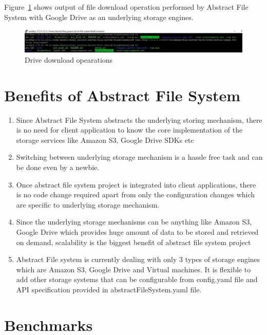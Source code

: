 Figure~\ref{fig:drive-download} 
shows output of file download operation performed 
by Abstract File System with Google Drive as an underlying storage engines. 

\begin{figure}[!ht]
        \centering\includegraphics[width=\columnwidth]
        {image/drive-download.JPG}
        \caption{Drive download opearations}\label{fig:drive-download}
\end{figure}


\section{Benefits of Abstract File System}
\begin{enumerate}
    \item Since Abstract File System abstracts the underlying storing 
mechanism, there is no need for client application to know 
the core implementation of the storage 
services like Amazon S3, Google Drive SDKs etc
    
    \item Switching between underlying storage mechanism is a hassle free task 
and can be done even by a newbie.
    
    \item Once abstract file system project is integrated into client 
applications, there is no code change required apart from only the 
configuration changes which are specific to underlying storage mechanism.
    
    \item Since the underlying storage mechanisms can be anything like Amazon 
S3, Google Drive which 
provides huge amount of data to be stored and retrieved on demand, scalability 
is the biggest benefit of abstract file system
	project
	
\item Abstract File system is currently dealing with only 3 types of
  storage engines which are Amazon S3, Google Drive and Virtual
  machines.  It is flexible to add other storage systems that can be
  configurable from config.yaml file and API specification provided in
  abstractFileSystem.yaml file.
    
\end{enumerate}


\section{Benchmarks}

